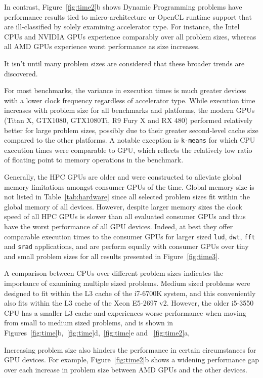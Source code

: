 \documentclass[../document.tex]{subfiles}
\begin{document}
In contrast, Figure~\ref{fig:time2}b shows Dynamic Programming problems have performance results tied to micro-architecture or OpenCL runtime support that are ill-classified by solely examining accelerator type.
For instance, the Intel CPUs and NVIDIA GPUs experience comparably over all problem sizes, whereas all AMD GPUs experience worst performance as size increases.

It isn't until many problem sizes are considered that these broader trends are discovered.

For most benchmarks, the variance in execution times is much greater devices with a lower clock frequency regardless of accelerator type.
While execution time increases with problem size for all benchmarks and platforms, the modern GPUs (Titan X, GTX1080, GTX1080Ti, R9 Fury X and RX 480) performed relatively better for large problem sizes, possibly due to their greater second-level cache size compared to the other platforms.
A notable exception is {\tt k-means} for which CPU execution times were comparable to GPU, which reflects the relatively low ratio of floating point to memory operations in the benchmark.

Generally, the HPC GPUs are older and were constructed to alleviate global memory limitations amongst consumer GPUs of the time.
Global memory size is not listed in Table~\ref{tab:hardware} since all selected problem sizes fit within the global memory of all devices.
However, despite larger memory sizes the clock speed of all HPC GPUs is slower than all evaluated consumer GPUs and thus have the worst performance of all GPU devices.
Indeed, at best they offer comparable execution times to the consumer GPUs for larger sized {\tt lud}, {\tt dwt}, {\tt fft} and {\tt srad} applications, and are perform equally with consumer GPUs over tiny and small problem sizes for all results presented in Figure~\ref{fig:time3}.

A comparison between CPUs over different problem sizes indicates the importance of examining multiple sized problems.
Medium sized problems were designed to fit within the L3 cache of the i7-6700K system, and this conveniently also fits within the L3 cache of the Xeon E5-2697 v2.
However, the older i5-3550 CPU has a smaller L3 cache and experiences worse performance when moving from small to medium sized problems, and is shown in Figures~\ref{fig:time}b,~\ref{fig:time}d,~\ref{fig:time}e and ~\ref{fig:time2}a,

Increasing problem size also hinders the performance in certain circumstances for GPU devices.
For example, Figure~\ref{fig:time2}b shows a widening performance gap over each increase in problem size between AMD GPUs and the other devices.
\end{document}

